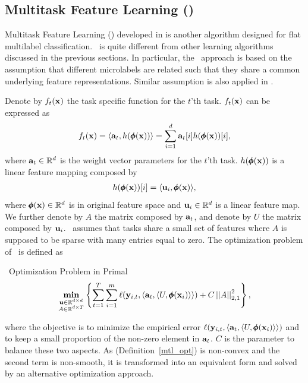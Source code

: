 {%
%
\subsection{Multitask Feature Learning (\mtl)} \label{sc_mtl}

Multitask Feature Learning (\mtl) developed in \citep{Argyriou07multitask} is another algorithm designed for flat multilabel classification.
\mtl\ is quite different from other learning algorithms discussed in the previous sections.
In particular, the \mtl\ approach is based on the assumption that different microlabels are related such that they share a common underlying feature representations.
Similar assumption is also applied in \citep{Caruana97multitask,Baxter00a,BenDavide03exploiting}.

Denote by $f_t(\mathbf {x})$ the task specific function for the $t$'th task.
$f_t(\mathbf {x})$ can be expressed as
\begin{align*}
	f_t(\mathbf {x}) = \langle \mathbf {a}_t, h(\pmb \phi(\mathbf {x})) \rangle = \sum_{i=1}^{d}\mathbf {a}_{t}[i]h(\pmb \phi(\mathbf {x}))[i],
\end{align*}
where $\mathbf {a}_t\in\mathbb{R}^d$ is the weight vector parameters for the $t$'th task.
$h(\pmb \phi(\mathbf {x}))$ is a linear feature mapping composed by
\begin{align*}
	h(\pmb \phi(\mathbf {x}))[i] = \langle \mathbf {u}_i, \pmb \phi(\mathbf {x}) \rangle,
\end{align*}
where $\pmb \phi(\mathbf {x})\in\mathbb{R}^d$ is in original feature space and $\mathbf {u}_i\in\mathbb{R}^{d}$ is a linear feature map.
We further denote by $A$ the matrix composed by $\mathbf {a}_{t}$, and denote by $U$ the matrix composed by $\mathbf {u}_i$.
\mtl\ assumes that tasks share a small set of features where $A$ is supposed to be sparse with many entries equal to zero.
The optimization problem of \mtl\ is defined as
\begin{definition}{\mtl\ Optimization Problem in Primal}\label{mtl_opt}
	\begin{align*}
		\underset{\substack{\mathbf {u}\in\mathbb{R}^{d\times d}\\A\in\mathbb{R}^{d\times T}}}{\textbf{min}} \left\{\sum_{t=1}^{T}\sum_{i=1}^{m}\ell(\mathbf {y}_{i,t},\langle \mathbf {a}_t, \langle U, \pmb \phi(\mathbf {x}_i) \rangle \rangle)+C\left|\left| A \right|\right|_{2,1}^2\right\},
	\end{align*}
\end{definition}
where the objective is to minimize the empirical error $\ell(\mathbf {y}_{i,t},\langle \mathbf {a}_t, \langle U, \pmb \phi(\mathbf {x}_i) \rangle \rangle)$ and to keep a small proportion of the non-zero element in $\mathbf {a}_t$.
$C$ is the parameter to balance these two aspects.
As (Definition~\ref{mtl_opt}) is non-convex and the second term is non-smooth, it is transformed into an equivalent form and solved by an alternative optimization approach.

}
